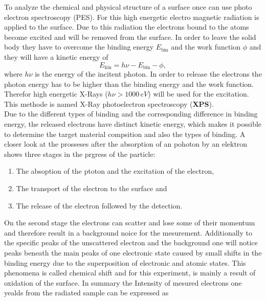 \documentclass[numbers=noenddot,a4paper]{article}
\begin{document}
To analyze the chemical and physical structure of a surface once can use photo electron spectroscopy (PES). For this high energetic electro magnetic radiation is applied to the surface. Due to this radiation the electrons bound to the atoms become excited and will be removed from the surface. In order to leave the solid body they have to overcome the binding energy $E_\mathrm{bin}$ and the work function $\phi$ and they will have a kinetic energy of
\begin{equation}
	E_\mathrm{kin} = h\nu - E_\mathrm{bin} - \phi,
\end{equation}
where $h \nu$ is the energy of the incitent photon. In order to release the electrons the photon energy has to be higher than the binding energy and the work function. Therefor high energetic X-Rays ($h\nu > 1000\mathrm\,{eV}$) will be used for the excitation. This methode is named X-Ray photoelectron spectroscopy (\textbf{XPS}).\\
Due to the different types of binding and the corresponding difference in binding energy, the released electrons have distinct kinetic energy, which makes it possible to determine the target material compsition and also the types of binding.
A closer look at the prosseses after the absorption of an pohoton by an elektron shows three stages in the prgress of the particle:
\begin{enumerate}
	\item The absoption of the ptoton and the excitation of the electron,
	\item The transport of the electron to the surface and
	\item The release of the electron followed by the detection.
\end{enumerate}

On the second stage the electrons can scatter and lose some of their momentum and therefore result in a background noice for the mesurement. 
Additionally to the specific peaks of the unscattered electron and the background one will notice peaks beneath the main peaks of one electronic state caused by small shifts in the binding energy due to the superposition of electronic and atomic states. This phenomena is called chemical shift and for this experiment, is mainly a result of oxidation of the surface.
In summary the Intensity of mesured electrons one yealds from the radiated sample can be expressed as
\end{document}
